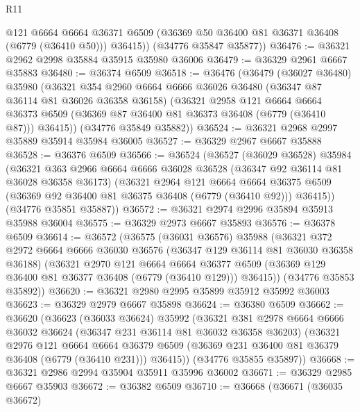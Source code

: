 \begin{lexlean}{R11}
\begin{coremodule}
          @121
          @6664
          @6664
          @36371
          @6509
          (@36369 @50 @36400 @81 @36371 @36408 (@6779 (@36410 @50)))
          @36415))
      (@34776 @35847 @35877))
@36476 := @36321 @2962 @2998 @35884 @35915 @35980 @36006
@36479 := @36329 @2961 @6667 @35883
@36480 := @36374 @6509
@36518 := @36476
    (@36479
      (@36027 @36480)
      @35980
      (@36321
        @354
        @2960
        @6664
        @6666
        @36026
        @36480
        (@36347 @87 @36114 @81 @36026 @36358 @36158)
        (@36321
          @2958
          @121
          @6664
          @6664
          @36373
          @6509
          (@36369 @87 @36400 @81 @36373 @36408 (@6779 (@36410 @87)))
          @36415))
      (@34776 @35849 @35882))
@36524 := @36321 @2968 @2997 @35889 @35914 @35984 @36005
@36527 := @36329 @2967 @6667 @35888
@36528 := @36376 @6509
@36566 := @36524
    (@36527
      (@36029 @36528)
      @35984
      (@36321
        @363
        @2966
        @6664
        @6666
        @36028
        @36528
        (@36347 @92 @36114 @81 @36028 @36358 @36173)
        (@36321
          @2964
          @121
          @6664
          @6664
          @36375
          @6509
          (@36369 @92 @36400 @81 @36375 @36408 (@6779 (@36410 @92)))
          @36415))
      (@34776 @35851 @35887))
@36572 := @36321 @2974 @2996 @35894 @35913 @35988 @36004
@36575 := @36329 @2973 @6667 @35893
@36576 := @36378 @6509
@36614 := @36572
    (@36575
      (@36031 @36576)
      @35988
      (@36321
        @372
        @2972
        @6664
        @6666
        @36030
        @36576
        (@36347 @129 @36114 @81 @36030 @36358 @36188)
        (@36321
          @2970
          @121
          @6664
          @6664
          @36377
          @6509
          (@36369 @129 @36400 @81 @36377 @36408 (@6779 (@36410 @129)))
          @36415))
      (@34776 @35853 @35892))
@36620 := @36321 @2980 @2995 @35899 @35912 @35992 @36003
@36623 := @36329 @2979 @6667 @35898
@36624 := @36380 @6509
@36662 := @36620
    (@36623
      (@36033 @36624)
      @35992
      (@36321
        @381
        @2978
        @6664
        @6666
        @36032
        @36624
        (@36347 @231 @36114 @81 @36032 @36358 @36203)
        (@36321
          @2976
          @121
          @6664
          @6664
          @36379
          @6509
          (@36369 @231 @36400 @81 @36379 @36408 (@6779 (@36410 @231)))
          @36415))
      (@34776 @35855 @35897))
@36668 := @36321 @2986 @2994 @35904 @35911 @35996 @36002
@36671 := @36329 @2985 @6667 @35903
@36672 := @36382 @6509
@36710 := @36668
    (@36671
      (@36035 @36672)

\end{coremodule}
\end{lexlean}
